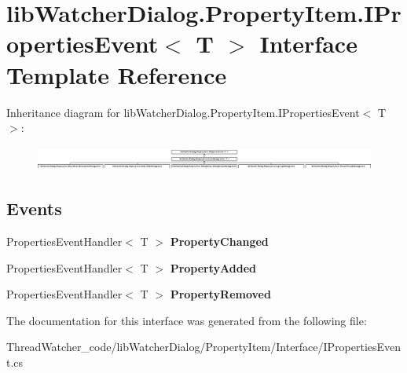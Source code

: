 \hypertarget{interfacelib_watcher_dialog_1_1_property_item_1_1_i_properties_event_3_01_t_01_4}{\section{lib\+Watcher\+Dialog.\+Property\+Item.\+I\+Properties\+Event$<$ T $>$ Interface Template Reference}
\label{interfacelib_watcher_dialog_1_1_property_item_1_1_i_properties_event_3_01_t_01_4}
}
Inheritance diagram for lib\+Watcher\+Dialog.\+Property\+Item.\+I\+Properties\+Event$<$ T $>$\+:\begin{figure}[H]
\begin{center}
\leavevmode
\includegraphics[height=0.805755cm]{interfacelib_watcher_dialog_1_1_property_item_1_1_i_properties_event_3_01_t_01_4}
\end{center}
\end{figure}
\subsection*{Events}
\begin{DoxyCompactItemize}
\item 
\hypertarget{interfacelib_watcher_dialog_1_1_property_item_1_1_i_properties_event_3_01_t_01_4_adb6c57714c155c68d02df0ab79e8699e}{Properties\+Event\+Handler$<$ T $>$ {\bfseries Property\+Changed}}\label{interfacelib_watcher_dialog_1_1_property_item_1_1_i_properties_event_3_01_t_01_4_adb6c57714c155c68d02df0ab79e8699e}

\item 
\hypertarget{interfacelib_watcher_dialog_1_1_property_item_1_1_i_properties_event_3_01_t_01_4_a84b5fe2a3e9fb987c1431ad0b26183cd}{Properties\+Event\+Handler$<$ T $>$ {\bfseries Property\+Added}}\label{interfacelib_watcher_dialog_1_1_property_item_1_1_i_properties_event_3_01_t_01_4_a84b5fe2a3e9fb987c1431ad0b26183cd}

\item 
\hypertarget{interfacelib_watcher_dialog_1_1_property_item_1_1_i_properties_event_3_01_t_01_4_abc6e1c05071458d6b2564f5e7c045370}{Properties\+Event\+Handler$<$ T $>$ {\bfseries Property\+Removed}}\label{interfacelib_watcher_dialog_1_1_property_item_1_1_i_properties_event_3_01_t_01_4_abc6e1c05071458d6b2564f5e7c045370}

\end{DoxyCompactItemize}


The documentation for this interface was generated from the following file\+:\begin{DoxyCompactItemize}
\item 
Thread\+Watcher\+\_\+code/lib\+Watcher\+Dialog/\+Property\+Item/\+Interface/I\+Properties\+Event.\+cs\end{DoxyCompactItemize}
